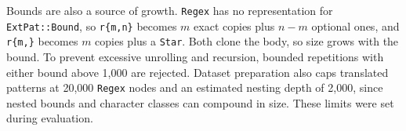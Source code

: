 \label{sec:frontend-bounds}
Bounds are also a source of growth. \texttt{Regex} has no
representation for \texttt{ExtPat::Bound}, so \texttt{r\{m,n\}}
becomes $m$ exact copies plus $n-m$ optional ones, and
\texttt{r\{m,\}} becomes $m$ copies plus a \texttt{Star}. Both clone
the body, so size grows with the bound.
To prevent excessive unrolling and recursion, 
bounded repetitions with either bound above 1{,}000 are rejected. 
Dataset preparation also caps translated patterns at 20{,}000 \texttt{Regex} nodes
and an estimated nesting depth of 2{,}000, 
since nested bounds and character classes can compound in size. 
These limits were set during evaluation.